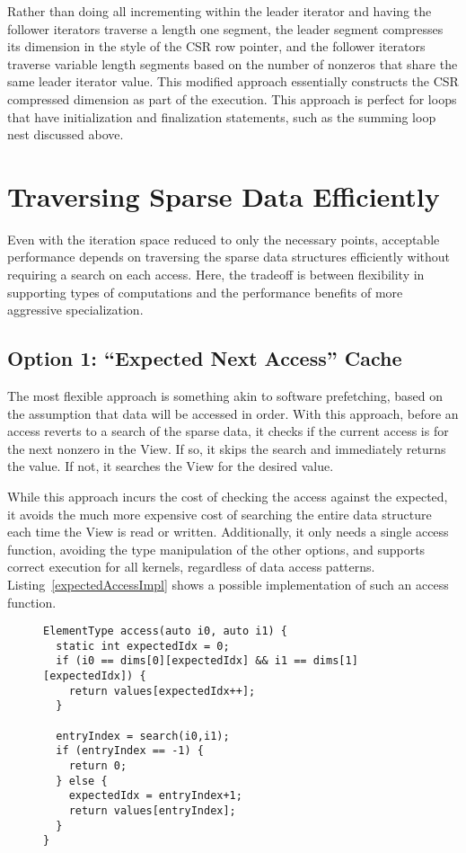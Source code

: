 Rather than doing all incrementing within the leader iterator and having the follower iterators traverse a length one segment, the leader segment compresses its dimension in the style of the CSR row pointer, and the follower iterators traverse variable length segments based on the number of nonzeros that share the same leader iterator value.
This modified approach essentially constructs the CSR compressed dimension as part of the execution.
This approach is perfect for loops that have initialization and finalization statements, such as the summing loop nest discussed above. 


\section{Traversing Sparse Data Efficiently}\label{sec:SparseAccess}\label{sec:EfficientTraversal}

Even with the iteration space reduced to only the necessary points, acceptable performance depends on traversing the sparse data structures efficiently without requiring a search on each access.
Here, the tradeoff is between flexibility in supporting types of computations and the performance benefits of more aggressive specialization.

\subsection{Option 1: ``Expected Next Access'' Cache}

The most flexible approach is something akin to software prefetching, based on the assumption that data will be accessed in order. 
With this approach, before an access reverts to a search of the sparse data, it checks if the current access is for the next nonzero in the View.
If so, it skips the search and immediately returns the value.
If not, it searches the View for the desired value.

While this approach incurs the cost of checking the access against the expected, it avoids the much more expensive cost of searching the entire data structure each time the View is read or written.
Additionally, it only needs a single access function, avoiding the type manipulation of the other options, and supports correct execution for all kernels, regardless of data access patterns.
Listing~\ref{expectedAccessImpl} shows a possible implementation of such an access function.
\begin{figure}
\begin{lstlisting}[caption={Possible implementation fo the Expected Next Access approach to efficient data traversal.},label=expectedAccessImpl]
ElementType access(auto i0, auto i1) {
  static int expectedIdx = 0;
  if (i0 == dims[0][expectedIdx] && i1 == dims[1][expectedIdx]) {
    return values[expectedIdx++];
  }
  
  entryIndex = search(i0,i1);
  if (entryIndex == -1) {
    return 0;
  } else {
    expectedIdx = entryIndex+1;
    return values[entryIndex];
  }
}
\end{lstlisting}
\end{figure}

